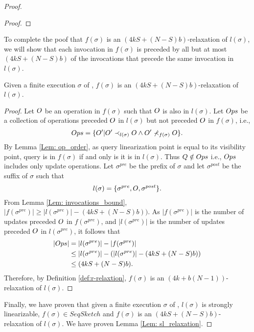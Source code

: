 \begin{proof}
\begin{proof}
\end{proof}

To complete the poof that $f(\sigma)$ is an \((4kS + (N-S)b)\)-relaxation of $l(\sigma)$, we will show that each invocation in $f(\sigma)$ is preceded by all but at most \((4kS + (N-S)b)\) of the invocations that precede the same invocation in $l(\sigma)$.

\begin{lemma}\label{Lem: relaxation}
Given a finite execution $\sigma$ of \mysketch, $f(\sigma)$ is an \((4kS + (N-S)b)\)-relaxation of $l(\sigma)$.
\end{lemma}
\begin{proof}
Let $\mathnormal{O}$ be an operation in $f(\sigma)$ such that $\mathnormal{O}$ is also in $l(\sigma)$. Let $\mathnormal{Ops}$ be a collection of operations preceded $\mathnormal{O}$ in $l(\sigma)$ but not preceded $\mathnormal{O}$ in $f(\sigma)$, i.e.,
\begin{align}
    \mathnormal{Ops}=\{\mathnormal{O}'| \mathnormal{O}' \prec_{l(\sigma)} \mathnormal{O} \wedge  \mathnormal{O}' \nprec_{f(\sigma)} \mathnormal{O} \}.
\end{align}
By Lemma \ref{Lem: op_order}, as query linearization point is equal to its visibility point, query is in $f(\sigma)$ if and only is it is in $l(\sigma)$. Thus \( \mathnormal{Q} \notin \mathnormal{Ops} \) i.e., $\mathnormal{Ops}$ includes only update operations. Let \(\sigma^{pre}\) be the prefix of $\sigma$ and let \(\sigma^{post}\) be the suffix of $\sigma$ such that
\begin{align}
 l(\sigma)=\{\sigma^{pre},\mathnormal{O},\sigma^{post}\}.
\end{align}
From Lemma \ref{Lem: invocations_bound}, \(|f(\sigma^{pre})| \ge |l(\sigma^{pre})| - (4kS + (N-S)b))\). As \(|f(\sigma^{pre})|\) is the number of updates preceded $\mathnormal{O}$ in \(f(\sigma^{pre})\), and \(|l(\sigma^{pre})|\) is the number of updates preceded $\mathnormal{O}$ in \(l(\sigma^{pre})\), it follows that
\begin{align}
    |\mathnormal{Ops}| &= |l(\sigma^{pre})|-|f(\sigma^{pre})| \\
                       &\leq |l(\sigma^{pre})|-(|l(\sigma^{pre})| - (4kS + (N-S)b))\\
                       &\leq (4kS + (N-S)b).
\end{align}
Therefore, by Definition \ref{def:r-relaxtion}, $f(\sigma)$ is an \((4k+b(N-1))\)-relaxation of $l(\sigma)$.
\end{proof}

Finally, we have proven that given a finite execution $\sigma$ of \mysketch, $l(\sigma)$ is strongly linearizable, \(f(\sigma) \in SeqSketch\) and $f(\sigma)$ is an \((4kS + (N-S)b)\)-relaxation of $l(\sigma)$. We have proven Lemma \ref{Lem: sl_relaxation}.

\end{proof}

